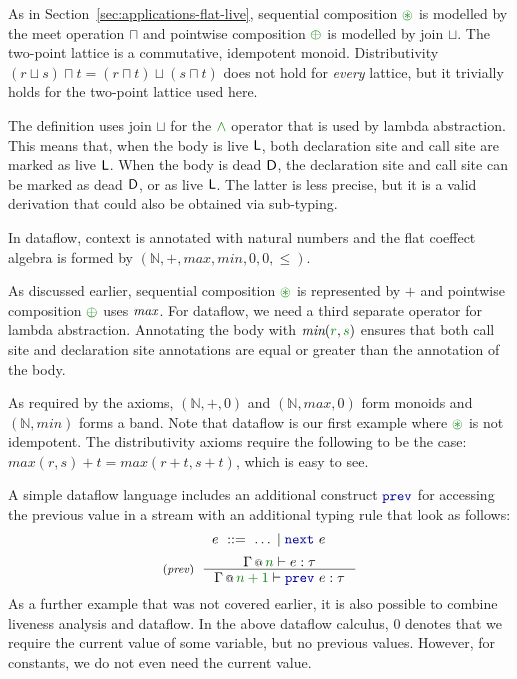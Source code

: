 As in Section~\ref{sec:applications-flat-live}, sequential composition $\cseq$ is modelled by
the meet operation $\sqcap$ and pointwise composition $\cpar$ is modelled by join $\sqcup$.
The two-point lattice is a commutative, idempotent monoid. Distributivity
$(r \sqcup s) \sqcap t = (r \sqcap t) \sqcup (s \sqcap t)$ does not hold for \emph{every}
lattice, but it trivially holds for the two-point lattice used here.

The definition uses join $\sqcup$ for the $\czip$ operator that is used by lambda abstraction.
This means that, when the body is live $\textnormal{\sffamily L}$, both declaration site and call site are
marked as live $\textnormal{\sffamily L}$. When the body is dead $\textnormal{\sffamily D}$, the declaration site and call site
can be marked as dead $\textnormal{\sffamily D}$, or as live $\textnormal{\sffamily L}$. The latter is less precise, but it
is a valid derivation that could also be obtained via sub-typing.

\begin{example}[Dataflow]
In dataflow, context is annotated with natural numbers and the flat coeffect algebra is formed
by $(\mathbb{N}, +, \mathit{max}, \mathit{min}, 0, 0, \leq)$.
\end{example}

\noindent
As discussed earlier, sequential composition $\cseq$ is represented by $+$ and pointwise
composition $\cpar$ uses $\emph{max}$. For dataflow, we need a third separate operator for
lambda abstraction. Annotating the body with $\emph{min}(\cclrd{r}, \cclrd{s})$ ensures that
both call site and declaration site annotations are equal or greater than the annotation
of the body.

As required by the axioms, $(\mathbb{N}, +, 0)$ and $(\mathbb{N}, \mathit{max}, 0)$ form monoids
and $(\mathbb{N}, \mathit{min})$ forms a band. Note that dataflow is our first example where
$\cseq$ is not idempotent. The distributivity axioms require the following to be the case:
$\mathit{max}(r,s) + t = \mathit{max}(r+t, s+t)$, which is easy to see.

A simple dataflow language includes an additional construct $\kvd{prev}$ for accessing the
previous value in a stream with an additional typing rule that look as follows:
%
\begin{equation*}
\quad~ e ~::=~ \ldots \sep \kvd{next}~e
\end{equation*}
\begin{equation*}
\tyrule{prev}
  { \coctx{\Gamma}{\cclrd{n}} \vdash e : \tau }
  { \coctx{\Gamma}{\cclrd{n+1}} \vdash \kvd{prev}~e : \tau }
\end{equation*}
%
As a further example that was not covered earlier, it is also possible to combine liveness analysis
and dataflow. In the above dataflow calculus, $0$ denotes that we require the current value of some
variable, but no previous values. However, for constants, we do not even need the current value.

